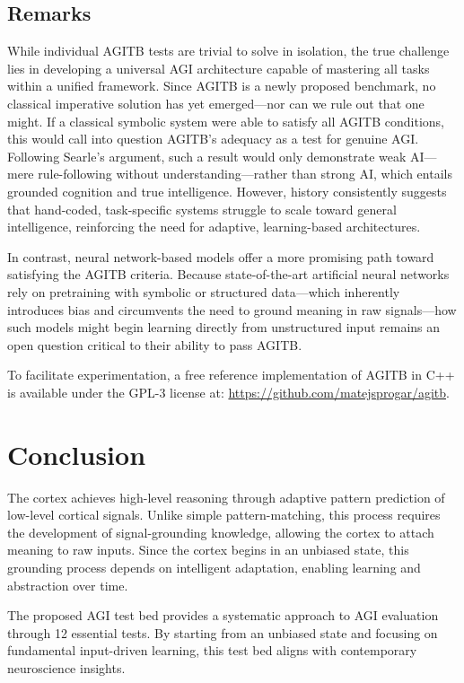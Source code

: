 \documentclass{article}
\begin{document}
\subsection{Remarks}
While individual AGITB tests are trivial to solve in isolation, the true challenge lies in developing a universal AGI architecture capable of mastering all tasks within a unified framework. Since AGITB is a newly proposed benchmark, no classical imperative solution has yet emerged—nor can we rule out that one might. If a classical symbolic system were able to satisfy all AGITB conditions, this would call into question AGITB’s adequacy as a test for genuine AGI. Following Searle’s argument, such a result would only demonstrate weak AI—mere rule-following without understanding—rather than strong AI, which entails grounded cognition and true intelligence. However, history consistently suggests that hand-coded, task-specific systems struggle to scale toward general intelligence, reinforcing the need for adaptive, learning-based architectures.

In contrast, neural network-based models offer a more promising path toward satisfying the AGITB criteria. Because state-of-the-art artificial neural networks rely on pretraining with symbolic or structured data—which inherently introduces bias and circumvents the need to ground meaning in raw signals—how such models might begin learning directly from unstructured input remains an open question critical to their ability to pass AGITB.

To facilitate experimentation, a free reference implementation of AGITB in C++ is available under the GPL-3 license at: \url{https://github.com/matejsprogar/agitb}.



\section{Conclusion}
The cortex achieves high-level reasoning through adaptive pattern prediction of low-level cortical signals. Unlike simple pattern-matching, this process requires the development of signal-grounding knowledge, allowing the cortex to attach meaning to raw inputs. Since the cortex begins in an unbiased state, this grounding process depends on intelligent adaptation, enabling learning and abstraction over time.

The proposed AGI test bed provides a systematic approach to AGI evaluation through 12 essential tests. By starting from an unbiased state and focusing on fundamental input-driven learning, this test bed aligns with contemporary neuroscience insights.
\end{document}
